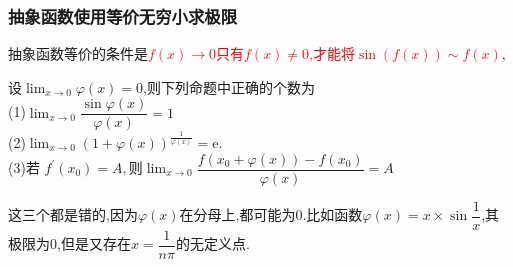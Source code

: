 \documentclass[9pt a4paper, oneside, UTF8]{ctexbook}
\begin{document}
\begin{sloppypar}
    \subsubsection{抽象函数使用等价无穷小求极限}
    抽象函数等价的条件是\textcolor{red}{$f(x) \to 0$只有$f(x) \neq 0$,才能将$\sin(f(x))\sim f(x)$},
    \begin{problem}
        设$\lim_{x\to0}\varphi(x)=0$,则下列命题中正确的个数为\\
        (1)$\lim_{x\to0}\dfrac{\sin\varphi(x)}{\varphi(x)}=1$\\
        (2)$\lim_{x\to0}(1+\varphi(x))^{\frac{1}{\varphi(x)}}=\mathrm{e}.$\\
        (3)$\text{若 }f^{\prime}(x_{0})=A,\text{则}\operatorname*{lim}_{x\to0}\dfrac{f(x_{0}+\varphi(x))-f(x_{0})}{\varphi(x)}=A$\\
    \end{problem}
    \begin{solution}
        这三个都是错的,因为$\varphi(x)$在分母上,都可能为0.比如函数$\varphi(x)=x\times\sin\dfrac{1}{x}$,其极限为0,但是又存在$x=\dfrac{1}{n\pi}$的无定义点.
    \end{solution}

\end{sloppypar}
\end{document}
